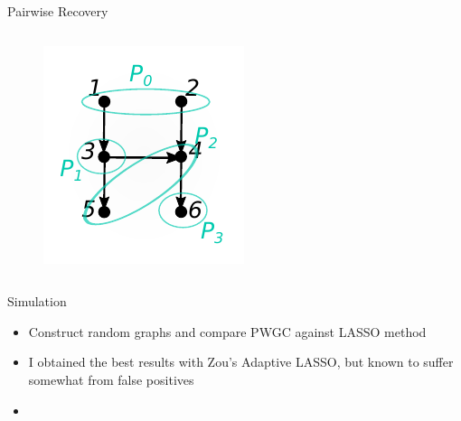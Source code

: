 \documentclass{beamer} %
\begin{document}
\begin{frame}{Pairwise Recovery}
\begin{columns}
    \begin{column}{0.5\linewidth}
      \begin{figure}
        \includegraphics[width=\linewidth]{../../figures/example_algorithm2.pdf}
      \end{figure}
    \end{column}
  \end{columns}
\end{frame}

\begin{frame}{Simulation}
  \begin{itemize}
    \item{Construct random graphs and compare PWGC against LASSO method}\pause
    \item{I obtained the best results with Zou's Adaptive LASSO, but known to suffer somewhat from false positives}
    \item{}
  \end{itemize}
\end{frame}
\end{document}
